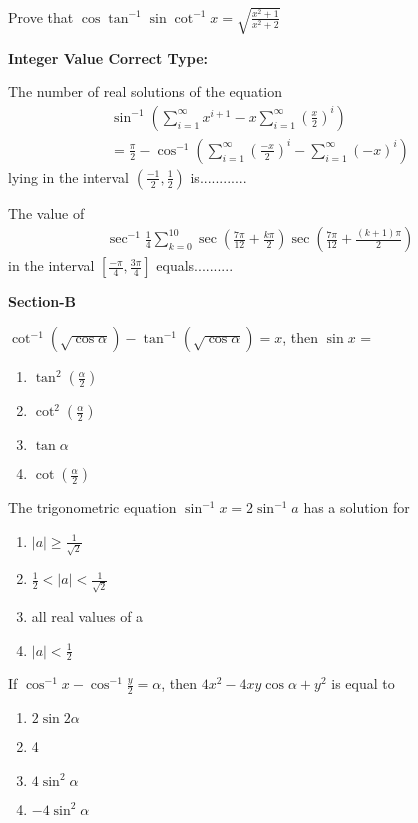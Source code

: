 \item Prove that $\cos \tan^{-1}\sin \cot^{-1}x = \sqrt{\frac{x^2 + 1}{x^2 + 2}}$

\textbf{Integer Value Correct Type:}

\item The number of real solutions of the equation
\begin{align*}
\sin^{-1} (\sum_{i = 1}^{\infty}x^{i + 1} - x\sum_{i = 1}^{\infty}(\frac{x}{2})^{i})\\
 = \frac{\pi}{2} - \cos^{-1}(\sum_{i = 1}^{\infty}(\frac{-x}{2})^{i} - \sum_{i = 1}^{\infty}(-x)^{i})
\end{align*}
lying in the interval $(\frac{-1}{2}, \frac{1}{2})$ is............

\item The value of 
\begin{align*}
\sec^{-1}\frac{1}{4}\sum_{k = 0}^{10}\sec(\frac{7\pi}{12} + \frac{k\pi}{2})\sec(\frac{7\pi}{12} + \frac{(k + 1)\pi}{2})
\end{align*}
in the interval $[\frac{-\pi}{4}, \frac{3\pi}{4}]$ equals..........

\textbf{Section-B}

\item $\cot^{-1}(\sqrt{\cos \alpha})-\tan^{-1}(\sqrt{\cos \alpha}) = x$, then $\sin x$ =
\begin{enumerate}
\item $\tan^{2}(\frac{\alpha}{2})$
\item $\cot^{2}(\frac{\alpha}{2})$
\item $\tan \alpha$
\item $\cot(\frac{\alpha}{2})$
\end{enumerate}

\item The trigonometric equation $\sin^{-1}x = 2\sin^{-1}a$ has a solution for
\begin{enumerate}
\item $|a| \geq \frac{1}{\sqrt{2}}$
\item $\frac{1}{2} < |a| < \frac{1}{\sqrt{2}}$
\item all real values of a
\item $|a| < \frac{1}{2}$
\end{enumerate}

\item If $\cos^{-1}x - \cos^{-1}\frac{y}{2} = \alpha$,  then $4x^2 - 4xy \cos \alpha + y^2$ is equal to
\begin{enumerate}
\item $2\sin 2\alpha$
\item 4
\item $4\sin^{2}\alpha$
\item $-4\sin^{2}\alpha$
\end{enumerate}

